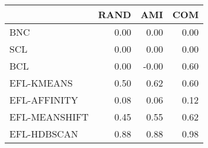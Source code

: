 \begin{tabular}{lrrr}
\toprule
 & RAND & AMI & COM \\
\midrule
BNC & 0.00 & 0.00 & 0.00 \\
SCL & 0.00 & 0.00 & 0.00 \\
BCL & 0.00 & -0.00 & 0.60 \\
EFL-KMEANS & 0.50 & 0.62 & 0.60 \\
EFL-AFFINITY & 0.08 & 0.06 & 0.12 \\
EFL-MEANSHIFT & 0.45 & 0.55 & 0.62 \\
EFL-HDBSCAN & 0.88 & 0.88 & 0.98 \\
\bottomrule
\end{tabular}
